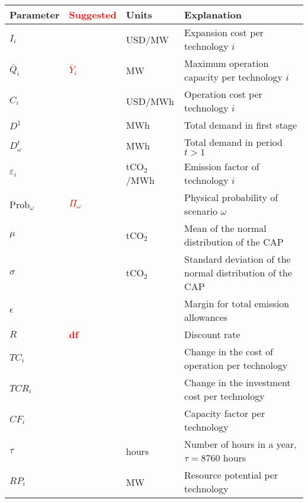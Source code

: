 \documentclass[11pt, letterpaper]{article}
\newcommand\boldred[1]{\textcolor{red}{\textbf{#1}}}
\begin{document}
\begin{center}
\begin{tabular}{  l l l l  } 
 \hline
 \textbf{Parameter} & \boldred{Suggested} & \textbf{Units} & \textbf{Explanation} \\ 
 \hline
 \hline
 $I_i$ & & USD/MW & Expansion cost per technology $i$ \\  
 $\bar{Q}_i$ & \boldred{$\bar{Y}_i$} & MW & Maximum operation capacity per technology $i$  \\ 
 $C_i$ &  & USD/MWh & Operation cost per technology $i$ \\
 $D^{1}$ & & MWh & Total demand in first stage \\
 $D^{t}_{\omega}$ & & MWh & Total demand in period $t > 1$ \\
 $\varepsilon_i$ & & tCO$_{2}$/MWh  & Emission factor of technology $i$\\
 Prob$_\omega$ & \boldred{$\Pi_\omega$} & & Physical probability of scenario $\omega$ \\
 $\mu$ & & tCO$_{2}$ & Mean of the normal distribution of the CAP \\
  $\sigma$ & & tCO$_{2}$ & Standard deviation of the normal distribution of the CAP \\
  $\epsilon$ & &  & Margin for total emission allowances \\
  $R$ & \boldred{df} & & Discount rate \\
  $TC_i$ & & & Change in the cost of operation per technology \\
  $TCR_i$ & & & Change in the investment cost per technology \\
  $CF_i$ & & & Capacity factor per technology\\
  $\tau$ & & hours&  Number of hours in a year, $\tau=8760$ hours\\
  {\color{blue} $RP_i$ } & & {\color{blue} MW} & {\color{blue} Resource potential per technology }\\
\hline
\end{tabular}
\end{center}
\end{document}
